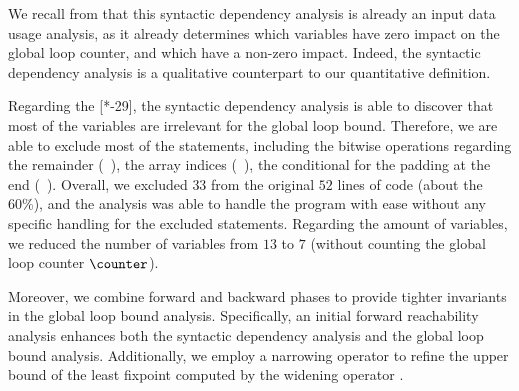 We recall from  that this syntactic dependency analysis is already an input data usage analysis, as it already determines which variables have zero impact on the global loop counter, and which have a non-zero impact.
Indeed, the syntactic dependency analysis is a qualitative counterpart to our quantitative definition.

\begin{example}
%   

Regarding the [*-29], the syntactic dependency analysis is able to discover that most of the variables are irrelevant for the global loop bound.
Therefore, we are able to exclude most of the statements, including the bitwise operations regarding the remainder (\eg~), the array indices (\eg~), the conditional for the padding at the end (\cf~).
%
Overall, we excluded $33$ from the original $52$ lines of code (about the 60\%), and the analysis was able to handle the program with ease without any specific handling for the excluded statements.
Regarding the amount of variables, we reduced the number of variables from $13$ to $7$ (without counting the global loop counter $\counter$).
\end{example}





Moreover, we combine forward and backward phases to provide tighter invariants in the global loop bound analysis.
Specifically, an initial forward reachability analysis enhances both the syntactic dependency analysis and the global loop bound analysis.
Additionally, we employ a narrowing operator to refine the upper bound of the least fixpoint computed by the widening operator .


